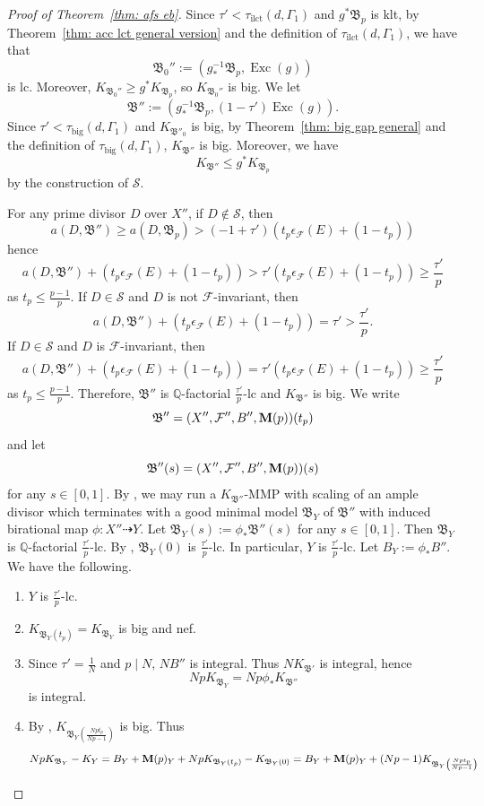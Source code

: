 \documentclass[11pt,reqno]{amsart}
\numberwithin{equation}{section}
\newcommand{\Mm}{{\bf{M}}}
\newcommand{\Exc}{\operatorname{Exc}}
\newcommand{\ilct}{\operatorname{ilct}}
\newcommand{\gt}{\operatorname{big}}
\newcommand{\Bb}{{\mathfrak{B}}}
\newcommand{\Ff}{\mathcal{F}}
\newcommand{\Ii}{\Gamma}
\theoremstyle{definition}
\begin{document}
\begin{proof}[Proof of Theorem~\ref{thm: afs eb}]
Since $\tau'<\tau_{\ilct}(d,\Ii_1)$ and $g^*\Bb_p$ is klt, by Theorem~\ref{thm: acc lct general version} and the definition of $\tau_{\ilct}(d,\Ii_1)$, we have that
$$\Bb_0'':=(g^{-1}_*\Bb_p,\Exc(g))$$
is lc. Moreover, $K_{\Bb_0''}\geq g^*K_{\Bb_p}$, so $K_{\Bb_0''}$ is big. We let
$$\Bb'':=\left(g^{-1}_*\Bb_p,(1-\tau')\Exc(g)\right).$$
Since $\tau'<\tau_{\gt}(d,\Ii_1)$ and $K_{\Bb''_0}$ is big, by Theorem~\ref{thm: big gap general} and the definition of $\tau_{\gt}(d,\Ii_1)$, $K_{\Bb''}$ is big. Moreover, we have $$K_{\Bb''}\leq g^*K_{\Bb_p}$$
by the construction of $\mathcal{S}$.

For any prime divisor $D$ over $X''$, if $D\not\in\mathcal{S}$, then
$$a(D,\Bb'')\geq a(D,\Bb_p)>(-1+\tau')(t_p\epsilon_{\Ff}(E)+(1-t_p))$$
hence
$$a(D,\Bb'')+\left(t_p\epsilon_{\Ff}(E)+(1-t_p)\right)>\tau'(t_p\epsilon_{\Ff}(E)+(1-t_p))\geq\frac{\tau'}{p}$$
as $t_p\leq\frac{p-1}{p}$. If $D\in\mathcal{S}$ and $D$ is not $\Ff$-invariant, then
$$a(D,\Bb'')+\left(t_p\epsilon_{\Ff}(E)+(1-t_p)\right)=\tau'>\frac{\tau'}{p}.$$
If $D\in\mathcal{S}$ and $D$ is $\Ff$-invariant, then
$$a(D,\Bb'')+\left(t_p\epsilon_{\Ff}(E)+(1-t_p)\right)=\tau'\left(t_p\epsilon_{\Ff}(E)+(1-t_p)\right)\geq\frac{\tau'}{p}$$
as $t_p\leq\frac{p-1}{p}$. Therefore, $\Bb''$ is $\mathbb Q$-factorial $\frac{\tau'}{p}$-lc and $K_{\Bb''}$ is big. We write
$$\Bb''=(X'',\Ff'',B'',\Mm(p))(t_p)$$
and let 
$$\Bb''(s)=(X'',\Ff'',B'',\Mm(p))(s)$$
for any $s\in [0,1]$. By \cite[Theorem~2.1.1]{Cas+25a}, we may run a $K_{\Bb''}$-MMP with scaling of an ample divisor which terminates with a good minimal model $\Bb_Y$ of $\Bb''$ with induced birational map $\phi\colon X''\dashrightarrow Y$. Let $\Bb_Y(s):=\phi_*\Bb''(s)$ for any $s\in [0,1]$. Then $\Bb_Y$ is $\mathbb Q$-factorial $\frac{\tau'}{p}$-lc. By \cite[Proposition~9.1]{Cas+25a}, $\Bb_Y(0)$ is $\frac{\tau'}{p}$-lc. In particular, $Y$ is $\frac{\tau'}{p}$-lc. Let $B_Y:=\phi_*B''$. We have the following.
\begin{enumerate}
    \item  $Y$ is $\frac{\tau'}{p}$-lc.
    \item $K_{\Bb_Y(t_p)}=K_{\Bb_Y}$ is big and nef.
    \item Since $\tau'=\frac{1}{N}$ and $p\mid N$, $NB''$ is integral. Thus $NK_{\Bb'}$ is integral, hence $$NpK_{\Bb_Y}=Np\phi_*K_{\Bb''}$$ is integral.
    \item By \cite[Theorem~5.1]{Cas+25a}, $K_{\Bb_Y\left(\frac{Npt_p}{Np-1}\right)}$ is big. 
Thus
    $$NpK_{\Bb_Y}-K_Y=B_Y+\Mm(p)_{Y}+NpK_{\Bb_Y(t_p)}-K_{\Bb_Y(0)}=B_Y+\Mm(p)_{Y}+(Np-1)K_{\Bb_Y\left(\frac{Npt_p}{Np-1}\right)}$$

\end{enumerate}
\end{proof}
\end{document}
